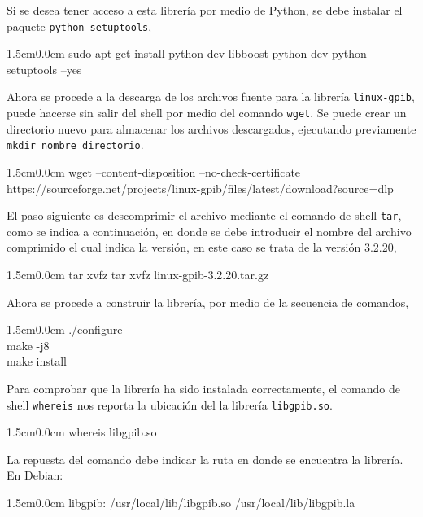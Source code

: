 \documentclass[paper=letter,oneside,fontsize=11pt, parskip=full]{scrartcl}
\newenvironment{code}
	{\begin{adjustwidth}{1.5cm}{0.0cm}\ttfamily}
	{\end{adjustwidth}}
\begin{document}
		Si se desea tener acceso a esta librería por medio de Python, se debe instalar el paquete \texttt{python-setuptools},
		\begin{code}		
			sudo apt-get install python-dev libboost-python-dev python-setuptools --yes
		\end{code}
			
		Ahora se procede a la descarga de los archivos fuente para la librería \texttt{linux-gpib}, puede hacerse sin salir del shell por medio del comando \texttt{wget}. Se puede crear un directorio nuevo para almacenar los archivos descargados, ejecutando previamente \texttt{mkdir nombre\_directorio}.
		
		\begin{code}
			wget --content-disposition --no-check-certificate \\
			https://sourceforge.net/projects/linux-gpib/files/latest/download?source=dlp
		\end{code}
		
		El paso siguiente es descomprimir el archivo mediante el comando de shell \texttt{tar}, como se indica a continuación, en donde se debe introducir el nombre del archivo comprimido el cual indica la versión, en este caso se trata de la versión 3.2.20,

		\begin{code}		
			tar xvfz tar xvfz linux-gpib-3.2.20.tar.gz
		\end{code}
			
		Ahora se procede a construir la librería, por medio de la secuencia de comandos,
		
		\begin{code}		
			./configure \\		
			make -j8 	\\		
			make install
		\end{code}
					
		Para comprobar que la librería ha sido instalada correctamente, el comando de shell \texttt{whereis} nos reporta la ubicación del la librería \texttt{libgpib.so}.
		
		\begin{code}
			whereis libgpib.so
		\end{code}
		
		La repuesta del comando debe indicar la ruta en donde se encuentra la librería. En Debian:

		\begin{code}		
			libgpib: /usr/local/lib/libgpib.so /usr/local/lib/libgpib.la
		\end{code}
	
\end{document}

